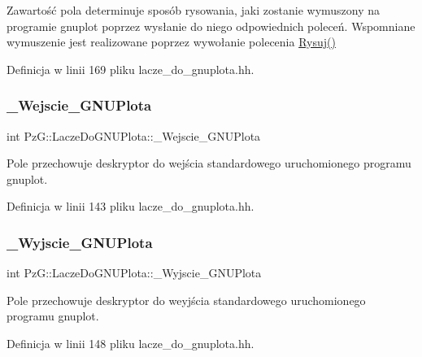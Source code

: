 Zawartość pola determinuje sposób rysowania, jaki zostanie wymuszony na programie {\ttfamily gnuplot} poprzez wysłanie do niego odpowiednich poleceń. Wspomniane wymuszenie jest realizowane poprzez wywołanie polecenia \mbox{\hyperlink{class_pz_g_1_1_lacze_do_g_n_u_plota_a065f5b8402737cc62b0ad4f66d028335}{Rysuj()}} 

Definicja w linii 169 pliku lacze\+\_\+do\+\_\+gnuplota.\+hh.

\mbox{\label{class_pz_g_1_1_lacze_do_g_n_u_plota_adc3a2250216c2473a61da379da70b2d7}} 
\subsubsection{\texorpdfstring{\_Wejscie\_GNUPlota}{\_Wejscie\_GNUPlota}}
{\footnotesize\ttfamily int Pz\+G\+::\+Lacze\+Do\+G\+N\+U\+Plota\+::\+\_\+\+Wejscie\+\_\+\+G\+N\+U\+Plota\hspace{0.3cm}{\ttfamily [protected]}}

Pole przechowuje deskryptor do wejścia standardowego uruchomionego programu gnuplot. 

Definicja w linii 143 pliku lacze\+\_\+do\+\_\+gnuplota.\+hh.

\mbox{\label{class_pz_g_1_1_lacze_do_g_n_u_plota_a7d05a4767a35ee494d59724bb740dbc2}} 
\subsubsection{\texorpdfstring{\_Wyjscie\_GNUPlota}{\_Wyjscie\_GNUPlota}}
{\footnotesize\ttfamily int Pz\+G\+::\+Lacze\+Do\+G\+N\+U\+Plota\+::\+\_\+\+Wyjscie\+\_\+\+G\+N\+U\+Plota\hspace{0.3cm}{\ttfamily [protected]}}

Pole przechowuje deskryptor do weyjścia standardowego uruchomionego programu gnuplot. 

Definicja w linii 148 pliku lacze\+\_\+do\+\_\+gnuplota.\+hh.

\mbox{\label{class_pz_g_1_1_lacze_do_g_n_u_plota_a2f2800f14ebfe1caef0b4d30c410a7fe}} 

